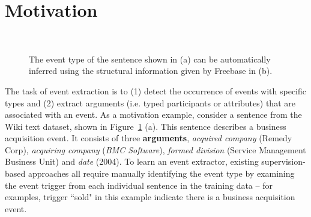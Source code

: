 \section{Motivation}
\begin{figure}
  \centering
   \\
  \caption{The event type of the sentence shown in (a) can be automatically inferred using the structural information given by Freebase in (b).}
  \label{fig:example}
\end{figure}


The task of event extraction is to (1) detect the occurrence of events with specific types and (2) extract arguments (i.e. typed
participants or attributes) that are associated with an event. As a motivation example, consider a sentence from the Wiki text dataset,
shown in Figure~\ref{fig:example} (a). This sentence describes a business acquisition event. It consists of three \textbf{arguments},
\emph{acquired company} (Remedy Corp), \emph{acquiring company} (\emph{BMC Software}), \emph{formed division} (Service Management Business
Unit) and \emph{date} (2004). To learn an event extractor, existing supervision-based approaches all require manually identifying the event
type by examining the event trigger from each individual sentence in the training data -- for examples, trigger ``sold" in this example
indicate there is a business acquisition event.

